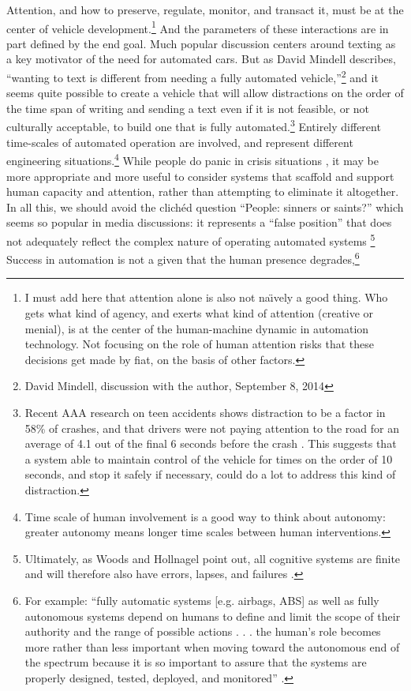 Attention, and how to preserve, regulate, monitor, and transact it,
must be at the center of vehicle development.\footnote{I must add here
that attention alone is also not na\"{\i}vely a good thing. Who gets what
kind of agency, and exerts what kind of attention (creative or menial), is at the center of
the human-machine dynamic in automation technology. Not focusing on
the role of human attention risks that these decisions get made
by fiat, on the basis of other factors.} And the parameters of
these interactions are in part defined by the end goal. Much popular
discussion centers around texting as a key motivator of the need for
automated cars. But as 
David Mindell describes, ``wanting to text is different
from needing a fully automated vehicle,''\footnote{David Mindell,
  discussion with the author, September 8, 2014} and it seems quite possible
to create a vehicle that will allow distractions on the order of the
time span of writing and sending a text even if it is not feasible, or
not culturally acceptable, to build one that is fully
automated.\footnote{Recent AAA research on teen accidents shows
  distraction to be a factor in 58\% of crashes, and that drivers were
not paying attention to the road for an average of 4.1 out of the
final 6 seconds before the crash \cite{greenDistraction}. This
suggests that a system able to 
maintain control of the vehicle for times on the order of 10 seconds,
and stop it safely if necessary, could do a lot to address this kind
of distraction.} Entirely different time-scales of automated operation
are involved, and represent different engineering
situations.\footnote{Time scale of human involvement is a good way to
  think about autonomy: greater autonomy means longer time scales
  between human interventions.} While
people do panic in crisis situations \cite{wiseFear},
it may be more appropriate and more useful to consider systems 
that scaffold and support human capacity and attention, rather than
attempting to eliminate it altogether. In
all this, we should avoid the clich\'{e}d question ``People: sinners
or saints?'' which seems so popular in media discussions: it represents
a ``false position'' that does not adequately reflect the complex
nature of operating automated
systems \cite[p. 1]{woodshollnagel}\footnote{Ultimately, as Woods and
Hollnagel point out, all cognitive systems are finite and will
therefore also have errors, lapses, and
failures \cite[p. 1--2]{woodshollnagel}.} Success in automation is not
a given that the human presence degrades,\footnote{For example:
``fully
automatic systems [e.g. airbags, ABS] as well as fully
autonomous systems depend on humans to define and limit the scope of
their authority and the range of possible actions . . . the human's role
becomes more rather than less important when moving toward the
autonomous end of the spectrum
because it is so important to assure that the systems are
properly designed, tested, deployed, and monitored'' \cite[p. 14-15]{NRCAutonomy}.}
